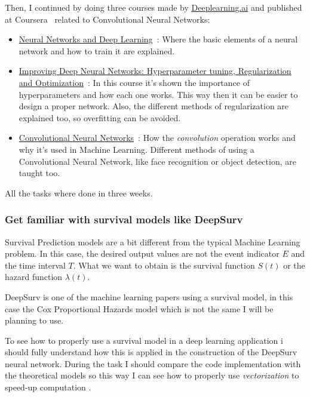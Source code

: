 Then, I continued by doing three courses made by \href{https://www.deeplearning.ai}{Deeplearning.ai}
and published at Coursera~\cite{Coursera} related to Convolutional Neural Networks:
\begin{itemize}
  \item \href{https://www.coursera.org/learn/neural-networks-deep-learning}{Neural Networks and 
    Deep Learning}~\cite{Coursera:NN}: Where the basic elements of a neural network and how
    to train it are explained.

  \item \href{https://www.coursera.org/learn/deep-neural-network}{Improving Deep Neural Networks: 
    Hyperparameter tuning, Regularization and Optimization}~\cite{Coursera:NNHyperparameters}: 
    In this course it's shown the importance of hyperparameters and how each one works. 
    This way then it can be easier to design a proper network. Also, the different methods 
    of regularization are explained too, so overfitting can be avoided.

  \item \href{https://www.coursera.org/learn/convolutional-neural-networks}{Convolutional Neural 
    Networks}~\cite{Coursera:CNN}:
    How the \emph{convolution} operation works and why it's used in Machine Learning. 
    Different methods of using a Convolutional Neural Network, like face recognition or 
    object detection, are taught too.
\end{itemize}

All the tasks where done in three weeks.

\subsubsection{Get familiar with survival models like DeepSurv}

Survival Prediction models are a bit different from the typical Machine Learning problem. 
In this case, the desired output values are not the event indicator \( E \) and the time
interval \( T \). What we want to obtain is the survival function \( S(t) \) or the 
hazard function \( \lambda(t) \).

DeepSurv is one of the machine learning papers using a survival model, in this case the
Cox Proportional Hazards model which is not the same I will be planning to use.

To see how to properly use a survival model in a deep learning application i should fully 
understand how this is applied in the construction of the DeepSurv neural network. During 
the task I should compare the code implementation with the theoretical models so this way
I can see how to properly use \emph{vectorization} to speed-up computation
\cites{Cox}{DeepSurv}.


